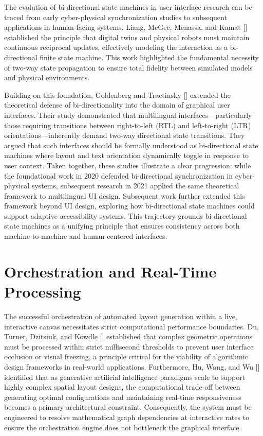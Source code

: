 \begin{refsection}
The evolution of bi-directional state machines in user interface research can be traced from early cyber-physical synchronization studies to subsequent applications in human-facing systems. Liang, McGee, Menassa, and Kamat [\citeyear{Liang2020Bidirectional}] established the principle that digital twins and physical robots must maintain continuous reciprocal updates, effectively modeling the interaction as a bi-directional finite state machine. This work highlighted the fundamental necessity of two-way state propagation to ensure total fidelity between simulated models and physical environments.

Building on this foundation, Goldenberg and Tractinsky [\citeyear{Goldenberg2021Bidirectional}] extended the theoretical defense of bi-directionality into the domain of graphical user interfaces. Their study demonstrated that multilingual interfaces—particularly those requiring transitions between right-to-left (RTL) and left-to-right (LTR) orientations—inherently demand two-way directional state transitions. They argued that such interfaces should be formally understood as bi-directional state machines where layout and text orientation dynamically toggle in response to user context. Taken together, these studies illustrate a clear progression: while the foundational work in 2020 defended bi-directional synchronization in cyber-physical systems, subsequent research in 2021 applied the same theoretical framework to multilingual UI design. Subsequent work further extended this framework beyond UI design, exploring how bi-directional state machines could support adaptive accessibility systems. This trajectory grounds bi-directional state machines as a unifying principle that ensures consistency across both machine-to-machine and human-centered interfaces.

\section{Orchestration and Real-Time Processing}

The successful orchestration of automated layout generation within a live, interactive canvas necessitates strict computational performance boundaries. Du, Turner, Dzitsiuk, and Kowdle [\citeyear{Du2020DepthLab}] established that complex geometric operations must be processed within strict millisecond thresholds to prevent user interface occlusion or visual freezing, a principle critical for the viability of algorithmic design frameworks in real-world applications. Furthermore, Hu, Wang, and Wu [\citeyear{Hu2025FacilityLayout}] identified that as generative artificial intelligence paradigms scale to support highly complex spatial layout designs, the computational trade-off between generating optimal configurations and maintaining real-time responsiveness becomes a primary architectural constraint. Consequently, the system must be engineered to resolve mathematical graph dependencies at interactive rates to ensure the orchestration engine does not bottleneck the graphical interface.


\end{refsection}
